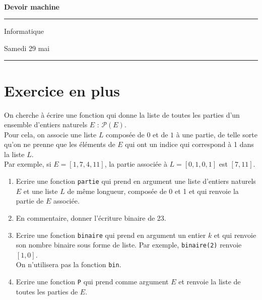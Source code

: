 \documentclass[a4paper,12pt]{article}
\begin{document}
\\

\begin{center}
{\LARGE  \textbf{Devoir machine}  \bigskip }

\rule{2.39cm}{0.05cm}

\bi 

{\large Informatique}\bigskip

{\large Samedi 29 mai}

\rule{2.39cm}{0.05cm}
\end{center}

\begin{center}
\end{center}


\section*{Exercice en plus}
\noi On cherche à écrire une fonction qui donne la liste de toutes les parties d'un ensemble d'entiers naturels $E$ : $\mathcal{P}(E)$.\\
Pour cela, on associe une liste $L$ composée de $0$ et de $1$ à une partie, de telle sorte qu'on ne prenne que les éléments de $E$ qui ont un indice qui correspond à 1 dans la liste $L$.\\
Par exemple, si $E=[1,7,4,11]$, la partie associée à $L=[0,1,0,1]$ est $[7,11]$.
\begin{enumerate}
\item Ecrire une fonction \verb?partie? qui prend en argument une liste d'entiers naturels $E$ et une liste $L$ de même longueur, composée de 0 et 1 et qui renvoie la partie de $E$ associée.
\item En commentaire, donner l'écriture binaire de 23. 
\item Ecrire une fonction \verb?binaire? qui prend en argument un entier $k$ et qui renvoie son nombre binaire sous forme de liste. Par exemple, \verb?binaire(2)? renvoie $[1,0]$.\\
On n'utilisera pas la fonction \verb?bin?.%
\item Ecrire une fonction \verb?P? qui prend comme argument $E$ et renvoie la liste de toutes les parties de $E$.
\end{enumerate}
\end{document}
